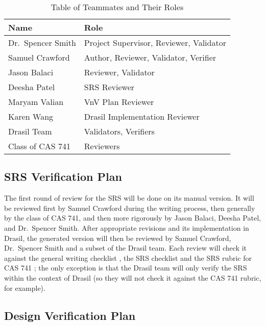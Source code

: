 \documentclass[12pt, titlepage]{article}
\begin{document}
\begin{table}[h!]
  \centering
  \begin{tabular}{| l | l |}
    \hline
    \rowcolor[gray]{0.9}
    \bf Name          & \bf Role                                \\
    \hline
    Dr.~Spencer Smith & Project Supervisor, Reviewer, Validator \\
    \hline
    Samuel Crawford   & Author, Reviewer, Validator, Verifier   \\
    \hline
    Jason Balaci      & Reviewer, Validator                     \\
    \hline
    Deesha Patel      & SRS Reviewer                            \\
    \hline
    Maryam Valian     & VnV Plan Reviewer                       \\
    \hline
    Karen Wang        & Drasil Implementation Reviewer          \\
    \hline
    Drasil Team       & Validators, Verifiers                   \\
    \hline
    Class of CAS 741  & Reviewers                               \\
    \hline
  \end{tabular}
  \caption{Table of Teammates and Their Roles}
  \label{table_team}
\end{table}

\subsection{SRS Verification Plan} \label{sec_srs_verif_plan}

The first round of review for the SRS will be done on its manual version.
It will be reviewed first by Samuel Crawford during the writing process, then
generally by the class of CAS 741, and then more rigorously by Jason Balaci,
Deesha Patel, and Dr.~Spencer Smith. After appropriate revisions and its
implementation in Drasil, the generated version will then be reviewed by Samuel
Crawford, Dr.~Spencer Smith and a subset of the Drasil team. Each review will
check it against the general writing checklist \cite{writing_checklist}, the
SRS checklist \cite{srs_checklist} and the SRS rubric for CAS 741 ; the only exception is that the Drasil team
will only verify the SRS within the context of Drasil (so they will not check
it against the CAS 741 rubric, for example).

\subsection{Design Verification Plan} \label{sec_desVerPlan}
\end{document}
